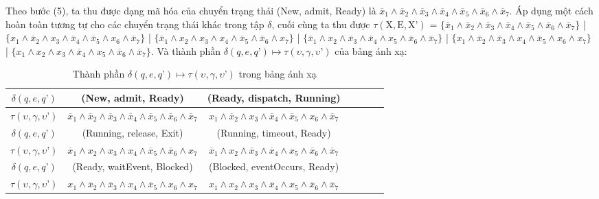 \documentclass[a4paper,13pt,oneside,openany]{book}
\begin{document}
\begin{flushleft}
	Theo bước (5), ta thu được dạng mã hóa của chuyển trạng thái (New, admit, Ready) là $\overline{x}_1 \land \overline{x}_2 \land \overline{x}_3 \land \overline{x}_4 \land \overline{x}_5 \land \overline{x}_6 \land \overline{x}_7$. Áp dụng một cách hoàn toàn tương tự cho các chuyển trạng thái khác trong tập $\delta$, cuối cùng ta thu được $\tau(\textrm{X}, \textrm{E}, \textrm{X'})$ = $\{\overline{x}_1 \land \overline{x}_2 \land \overline{x}_3 \land \overline{x}_4 \land \overline{x}_5 \land \overline{x}_6 \land \overline{x}_7\}$ | $\{x_1 \land \overline{x}_2 \land x_3 \land \overline{x}_4 \land \overline{x}_5 \land x_6 \land \overline{x}_7\}$ | $\{\overline{x}_1 \land x_2 \land x_3 \land x_4 \land \overline{x}_5 \land \overline{x}_6 \land x_7\}$ | $\{\overline{x}_1 \land x_2 \land \overline{x}_3 \land \overline{x}_4 \land x_5 \land \overline{x}_6 \land \overline{x}_7\}$ | $\{x_1 \land \overline{x}_2 \land \overline{x}_3 \land x_4 \land \overline{x}_5 \land x_6 \land x_7\}$ | $\{x_1 \land x_2 \land x_3 \land \overline{x}_4 \land x_5 \land \overline{x}_6 \land \overline{x}_7\}$.
	Và thành phần $\delta(q, e, q\textrm{'}) \mapsto \tau(\upsilon, \gamma, \upsilon\textrm{'})$ của bảng ánh xạ:
	\begin{table}[!ht]
		\centering
		\renewcommand{\arraystretch}{1.25}
		\begin{tabular}{|c|c|c|c|c|c|c|}
			\hline
			$\delta(q, e, q\textrm{'})$ & (New, admit, Ready) & (Ready, dispatch, Running) \\
			\hline
			$\tau(\upsilon, \gamma, \upsilon\textrm{'})$ & $\overline{x}_1 \land \overline{x}_2 \land \overline{x}_3 \land \overline{x}_4 \land \overline{x}_5 \land \overline{x}_6 \land \overline{x}_7$ & $x_1 \land \overline{x}_2 \land x_3 \land \overline{x}_4 \land \overline{x}_5 \land x_6 \land \overline{x}_7$ \\
			\hline
			$\delta(q, e, q\textrm{'})$ & (Running, release, Exit) & (Running, timeout, Ready)\\
			\hline
			$\tau(\upsilon, \gamma, \upsilon\textrm{'})$ & $\overline{x}_1 \land x_2 \land x_3 \land x_4 \land \overline{x}_5 \land \overline{x}_6 \land x_7$ & $\overline{x}_1 \land x_2 \land \overline{x}_3 \land \overline{x}_4 \land x_5 \land \overline{x}_6 \land \overline{x}_7$\\
			\hline
			$\delta(q, e, q\textrm{'})$ & (Ready, waitEvent, Blocked) & (Blocked, eventOccurs, Ready) \\
			\hline
			$\tau(\upsilon, \gamma, \upsilon\textrm{'})$ & $x_1 \land \overline{x}_2 \land \overline{x}_3 \land x_4 \land \overline{x}_5 \land x_6 \land x_7$ & $x_1 \land x_2 \land x_3 \land \overline{x}_4 \land x_5 \land \overline{x}_6 \land \overline{x}_7$\\
			\hline
		\end{tabular}
		\caption{Thành phần $\delta(q, e, q\textrm{'}) \mapsto \tau(\upsilon, \gamma, \upsilon\textrm{'})$ trong bảng ánh xạ}
	\end{table}
	

\end{flushleft}
\end{document}
